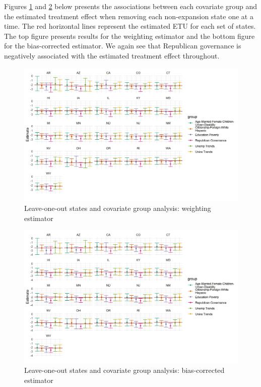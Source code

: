 \documentclass[12pt]{article}
\begin{document}
Figures \ref{loostatecovswt} and \ref{loostatecovsdr} below presents the associations between each covariate group and the estimated treatment effect when removing each non-expansion state one at a time. The red horizontal lines represent the estimated ETU for each set of states. The top figure presents results for the weighting estimator and the bottom figure for the bias-corrected estimator. We again see that Republican governance is negatively associated with the estimated treatment effect throughout.

\begin{figure}[H]
\begin{center}
    \includegraphics[scale=0.6]{images/loo-covs-state-all-wgt.jpeg}
    \caption{Leave-one-out states and covariate group analysis: weighting estimator}
    \label{loostatecovswt}
\end{center}
\end{figure}

\begin{figure}[H]
\begin{center}
    \includegraphics[scale=0.6]{images/loo-covs-state-all-dr.jpeg}
    \caption{Leave-one-out states and covariate group analysis: bias-corrected estimator}
    \label{loostatecovsdr}
\end{center}
\end{figure}
\end{document}
